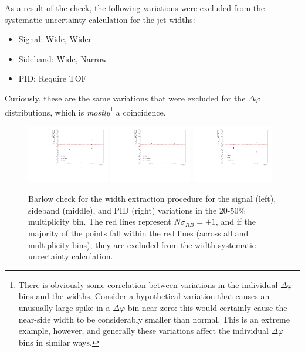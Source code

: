 As a result of the check, the following variations were excluded from the systematic uncertainty calculation for the jet widths:
%
\begin{itemize}
    \item Signal: Wide, Wider
    \item Sideband: Wide, Narrow
    \item PID: Require TOF
\end{itemize}
%
Curiously, these are the same variations that were excluded for the $\Delta\varphi$ distributions, which is \textit{mostly}\footnote{There is obviously some correlation between variations in the individual $\Delta\varphi$ bins and the widths. Consider a hypothetical variation that causes an unusually large spike in a $\Delta\varphi$ bin near zero: this would certainly cause the near-side width to be considerably smaller than normal. This is an extreme example, however, and generally these variations affect the individual $\Delta\varphi$ bins in similar ways.} a coincidence. 

\begin{figure}[ht]
    \centering
    \includegraphics[width=0.32\textwidth]{figures/analysis/width_signal_barlow_20_50.pdf}
    \includegraphics[width=0.32\textwidth]{figures/analysis/width_sideband_barlow_20_50.pdf}
    \includegraphics[width=0.32\textwidth]{figures/analysis/width_pid_barlow_20_50.pdf}
    \caption{Barlow check for the width extraction procedure for the signal (left), sideband (middle), and PID (right) variations in the 20-50\% multiplicity bin. The red lines represent $N\sigma_{RB} = \pm 1$, and if the majority of the points fall within the red lines (across all \pt and multiplicity bins), they are excluded from the width systematic uncertainty calculation.}
    \label{barlow_check_width_20_50}
\end{figure}

